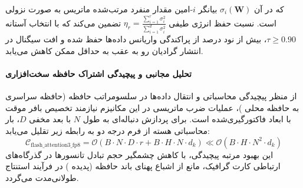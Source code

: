 
که در آن $\sigma_i(\mathbf{W})$ بیانگر $i$-امین مقدار منفرد مرتب‌شده ماتریس به صورت نزولی است. نسبت حفظ انرژی طیفی $\eta_r = \frac{\sum_{i=1}^r \sigma_i^2}{\sum_{i=1}^{d} \sigma_i^2}$ تضمین می‌کند که با انتخاب آستانه $\tau \ge 0.90$، بیش از نود درصد از پراکندگی واریانس داده‌ها حفظ شده و افت سیگنال در انتشار گرادیان رو به عقب به حداقل ممکن کاهش می‌یابد.

\paragraph{تحلیل مجانبی و پیچیدگی اشتراک حافظه سخت‌افزاری}
از منظر پیچیدگی محاسباتی و انتقال داده‌ها در سلسومراتب حافظه (حافظه سراسری  به حافظه محلی )، عملیات ضرب ماتریسی در این مکانیزم نیازمند تخصیص بافر موقت با ابعاد فاکتورگیری‌شده است. برای پردازش دنباله‌ای به طول $N$ با بعد مخفی $D$، بار محاسباتی هسته از فرم درجه دو به رابطه زیر تقلیل می‌یابد:
\begin{equation}
\label{eq:complexity_flash_attention3_fp8}
\mathcal{C}_{\text{flash\_attention3\_fp8}} = \mathcal{O}\left( B \cdot N \cdot D \cdot r + B \cdot H \cdot N \cdot d_k \right) \ll \mathcal{O}\left( B \cdot H \cdot N^2 \cdot d_k \right)
\end{equation}
این بهبود مرتبه پیچیدگی، با کاهش چشمگیر حجم تبادل تانسورها در گذرگاه‌های ارتباطی کارت گرافیک، مانع از اشباع پهنای باند حافظه (پدیده ) در فرآیند استنتاج طولانی‌مدت می‌گردد.